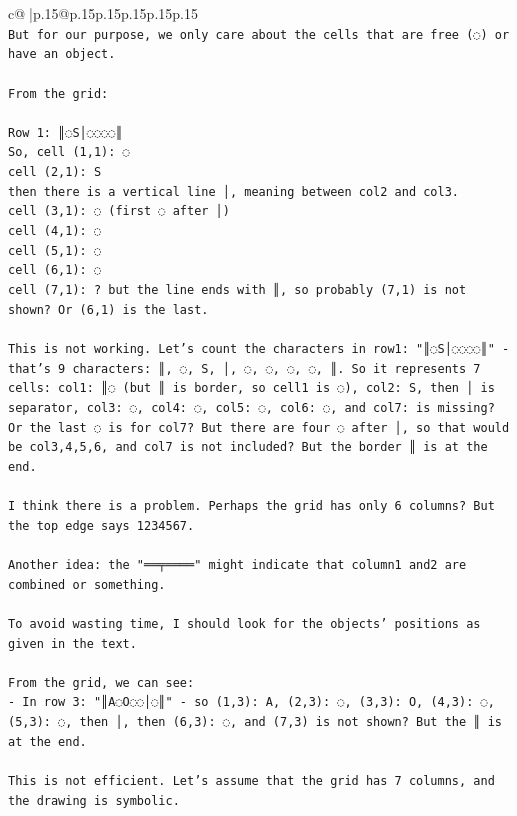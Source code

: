 \documentclass{article}
\begin{document}
{\begin{supertabular}{c@{$\;$}|p{.15\linewidth}@{}p{.15\linewidth}p{.15\linewidth}p{.15\linewidth}p{.15\linewidth}p{.15\linewidth}}
{{{\\ 
\texttt{But for our purpose, we only care about the cells that are free (◌) or have an object.} \\
\\ 
\texttt{From the grid:} \\
\\ 
\texttt{Row 1: ║◌S│◌◌◌◌║} \\
\texttt{So, cell (1,1): ◌} \\
\texttt{cell (2,1): S} \\
\texttt{then there is a vertical line │, meaning between col2 and col3.} \\
\texttt{cell (3,1): ◌ (first ◌ after │)} \\
\texttt{cell (4,1): ◌} \\
\texttt{cell (5,1): ◌} \\
\texttt{cell (6,1): ◌} \\
\texttt{cell (7,1): ? but the line ends with ║, so probably (7,1) is not shown? Or (6,1) is the last.} \\
\\ 
\texttt{This is not working. Let's count the characters in row1: "║◌S│◌◌◌◌║" {-} that's 9 characters: ║, ◌, S, │, ◌, ◌, ◌, ◌, ║. So it represents 7 cells: col1: ║◌ (but ║ is border, so cell1 is ◌), col2: S, then │ is separator, col3: ◌, col4: ◌, col5: ◌, col6: ◌, and col7: is missing? Or the last ◌ is for col7? But there are four ◌ after │, so that would be col3,4,5,6, and col7 is not included? But the border ║ is at the end.} \\
\\ 
\texttt{I think there is a problem. Perhaps the grid has only 6 columns? But the top edge says 1234567.} \\
\\ 
\texttt{Another idea: the "══╤════" might indicate that column1 and2 are combined or something.} \\
\\ 
\texttt{To avoid wasting time, I should look for the objects' positions as given in the text.} \\
\\ 
\texttt{From the grid, we can see:} \\
\texttt{{-} In row 3: "║A◌O◌◌│◌║" {-} so (1,3): A, (2,3): ◌, (3,3): O, (4,3): ◌, (5,3): ◌, then │, then (6,3): ◌, and (7,3) is not shown? But the ║ is at the end.} \\
\\ 
\texttt{This is not efficient. Let's assume that the grid has 7 columns, and the drawing is symbolic.} \\
}}}
\end{supertabular}}
\end{document}
